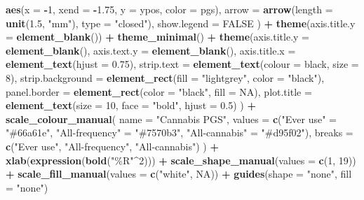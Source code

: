 \documentclass[
]{article}
\newenvironment{Shaded}{\begin{snugshade}}{\end{snugshade}}
\newcommand{\AttributeTok}[1]{\textcolor[rgb]{0.13,0.29,0.53}{#1}}
\newcommand{\ConstantTok}[1]{\textcolor[rgb]{0.56,0.35,0.01}{#1}}
\newcommand{\DecValTok}[1]{\textcolor[rgb]{0.00,0.00,0.81}{#1}}
\newcommand{\FloatTok}[1]{\textcolor[rgb]{0.00,0.00,0.81}{#1}}
\newcommand{\FunctionTok}[1]{\textcolor[rgb]{0.13,0.29,0.53}{\textbf{#1}}}
\newcommand{\NormalTok}[1]{#1}
\newcommand{\OtherTok}[1]{\textcolor[rgb]{0.56,0.35,0.01}{#1}}
\newcommand{\SpecialCharTok}[1]{\textcolor[rgb]{0.81,0.36,0.00}{\textbf{#1}}}
\newcommand{\StringTok}[1]{\textcolor[rgb]{0.31,0.60,0.02}{#1}}
\begin{document}
\begin{Shaded}
\begin{Highlighting}[]
    \FunctionTok{aes}\NormalTok{(}\AttributeTok{x =} \SpecialCharTok{{-}}\DecValTok{1}\NormalTok{, }\AttributeTok{xend =} \SpecialCharTok{{-}}\FloatTok{1.75}\NormalTok{, }\AttributeTok{y =}\NormalTok{ ypos,}
        \AttributeTok{color =}\NormalTok{ pgs),}
    \AttributeTok{arrow =} \FunctionTok{arrow}\NormalTok{(}\AttributeTok{length =} \FunctionTok{unit}\NormalTok{(}\FloatTok{1.5}\NormalTok{, }\StringTok{"mm"}\NormalTok{), }\AttributeTok{type =} \StringTok{"closed"}\NormalTok{),}
    \AttributeTok{show.legend =} \ConstantTok{FALSE}
\NormalTok{  ) }\SpecialCharTok{+}
  \FunctionTok{theme}\NormalTok{(}\AttributeTok{axis.title.y =} \FunctionTok{element\_blank}\NormalTok{()) }\SpecialCharTok{+}
  \FunctionTok{theme\_minimal}\NormalTok{() }\SpecialCharTok{+}
  \FunctionTok{theme}\NormalTok{(}\AttributeTok{axis.title.y =} \FunctionTok{element\_blank}\NormalTok{(),}
        \AttributeTok{axis.text.y =} \FunctionTok{element\_blank}\NormalTok{(),}
        \AttributeTok{axis.title.x =} \FunctionTok{element\_text}\NormalTok{(}\AttributeTok{hjust =} \FloatTok{0.75}\NormalTok{),}
        \AttributeTok{strip.text =} \FunctionTok{element\_text}\NormalTok{(}\AttributeTok{colour =} \StringTok{\textquotesingle{}black\textquotesingle{}}\NormalTok{, }\AttributeTok{size =} \DecValTok{8}\NormalTok{),}
        \AttributeTok{strip.background =} \FunctionTok{element\_rect}\NormalTok{(}\AttributeTok{fill =} \StringTok{"lightgrey"}\NormalTok{, }\AttributeTok{color =} \StringTok{"black"}\NormalTok{),}
        \AttributeTok{panel.border =} \FunctionTok{element\_rect}\NormalTok{(}\AttributeTok{color =} \StringTok{"black"}\NormalTok{, }\AttributeTok{fill =} \ConstantTok{NA}\NormalTok{), }
        \AttributeTok{plot.title =} \FunctionTok{element\_text}\NormalTok{(}\AttributeTok{size =} \DecValTok{10}\NormalTok{, }\AttributeTok{face =} \StringTok{"bold"}\NormalTok{, }\AttributeTok{hjust =} \FloatTok{0.5}\NormalTok{)}
\NormalTok{  ) }\SpecialCharTok{+}
  \FunctionTok{scale\_colour\_manual}\NormalTok{(}
        \AttributeTok{name =} \StringTok{"Cannabis PGS"}\NormalTok{,}
        \AttributeTok{values =} \FunctionTok{c}\NormalTok{(}\StringTok{"Ever use"} \OtherTok{=} \StringTok{"\#66a61e"}\NormalTok{, }\StringTok{"All{-}frequency"} \OtherTok{=} \StringTok{"\#7570b3"}\NormalTok{, }\StringTok{"All{-}cannabis"} \OtherTok{=} \StringTok{"\#d95f02"}\NormalTok{),}
        \AttributeTok{breaks =} \FunctionTok{c}\NormalTok{(}\StringTok{"Ever use"}\NormalTok{, }\StringTok{"All{-}frequency"}\NormalTok{, }\StringTok{"All{-}cannabis"}\NormalTok{) }
\NormalTok{      ) }\SpecialCharTok{+}
  \FunctionTok{xlab}\NormalTok{(}\FunctionTok{expression}\NormalTok{(}\FunctionTok{bold}\NormalTok{(}\StringTok{"\%R"}\SpecialCharTok{\^{}}\DecValTok{2}\NormalTok{))) }\SpecialCharTok{+}
  \FunctionTok{scale\_shape\_manual}\NormalTok{(}\AttributeTok{values =} \FunctionTok{c}\NormalTok{(}\DecValTok{1}\NormalTok{, }\DecValTok{19}\NormalTok{)) }\SpecialCharTok{+}
  \FunctionTok{scale\_fill\_manual}\NormalTok{(}\AttributeTok{values =} \FunctionTok{c}\NormalTok{(}\StringTok{"white"}\NormalTok{, }\ConstantTok{NA}\NormalTok{)) }\SpecialCharTok{+}
  \FunctionTok{guides}\NormalTok{(}\AttributeTok{shape =} \StringTok{"none"}\NormalTok{, }\AttributeTok{fill =} \StringTok{"none"}\NormalTok{)}



\end{Highlighting}
\end{Shaded}
\end{document}
